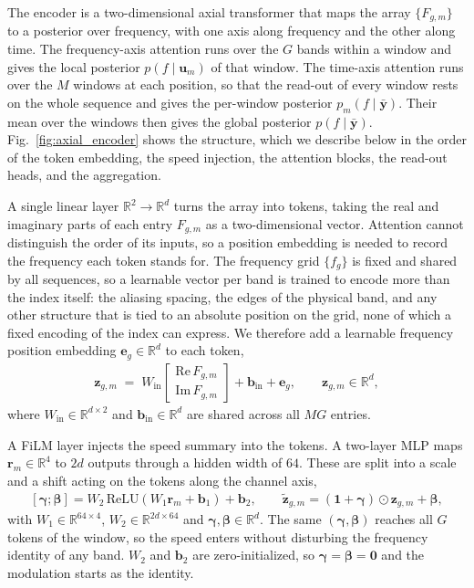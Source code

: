\documentclass[journal,onecolumn]{IEEEtran}
\begin{document}
The encoder is a two-dimensional axial transformer that maps the array $\{F_{g,m}\}$ to a posterior over frequency, with one axis along frequency and the other along time. The frequency-axis attention runs over the $G$ bands within a window and gives the local posterior $p(f\mid\mathbf{u}_m)$ of that window. The time-axis attention runs over the $M$ windows at each position, so that the read-out of every window rests on the whole sequence and gives the per-window posterior $p_m(f\mid\bar{\mathbf{y}})$. Their mean over the windows then gives the global posterior $p(f\mid\bar{\mathbf{y}})$. Fig.~\ref{fig:axial_encoder} shows the structure, which we describe below in the order of the token embedding, the speed injection, the attention blocks, the read-out heads, and the aggregation.

A single linear layer $\mathbb{R}^{2}\to\mathbb{R}^{d}$ turns the array into tokens, taking the real and imaginary parts of each entry $F_{g,m}$ as a two-dimensional vector. Attention cannot distinguish the order of its inputs, so a position embedding is needed to record the frequency each token stands for. The frequency grid $\{f_g\}$ is fixed and shared by all sequences, so a learnable vector per band is trained to encode more than the index itself: the aliasing spacing, the edges of the physical band, and any other structure that is tied to an absolute position on the grid, none of which a fixed encoding of the index can express. We therefore add a learnable frequency position embedding $\mathbf{e}_g\in\mathbb{R}^{d}$ to each token,
\begin{eqnarray}
\label{eq:embed}
\mathbf{z}_{g,m} \;=\; W_{\mathrm{in}}
\begin{bmatrix}\mathrm{Re}\,F_{g,m}\\[2pt] \mathrm{Im}\,F_{g,m}\end{bmatrix}
+\mathbf{b}_{\mathrm{in}}+\mathbf{e}_g ,
\qquad \mathbf{z}_{g,m}\in\mathbb{R}^{d},
\end{eqnarray}
where $W_{\mathrm{in}}\in\mathbb{R}^{d\times 2}$ and $\mathbf{b}_{\mathrm{in}}\in\mathbb{R}^{d}$ are shared across all $MG$ entries.

A FiLM layer injects the speed summary into the tokens. A two-layer MLP maps $\mathbf{r}_m\in\mathbb{R}^{4}$ to $2d$ outputs through a hidden width of $64$. These are split into a scale and a shift acting on the tokens along the channel axis,
\begin{eqnarray}
\label{eq:film}
[\boldsymbol\gamma;\boldsymbol\beta]=W_2\,\mathrm{ReLU}(W_1\mathbf{r}_m+\mathbf{b}_1)+\mathbf{b}_2,
\qquad
\tilde{\mathbf{z}}_{g,m}=(\mathbf{1}+\boldsymbol\gamma)\odot\mathbf{z}_{g,m}+\boldsymbol\beta ,
\end{eqnarray}
with $W_1\in\mathbb{R}^{64\times 4}$, $W_2\in\mathbb{R}^{2d\times 64}$ and $\boldsymbol\gamma,\boldsymbol\beta\in\mathbb{R}^{d}$. The same $(\boldsymbol\gamma,\boldsymbol\beta)$ reaches all $G$ tokens of the window, so the speed enters without disturbing the frequency identity of any band. $W_2$ and $\mathbf{b}_2$ are zero-initialized, so $\boldsymbol\gamma=\boldsymbol\beta=\mathbf{0}$ and the modulation starts as the identity.
\end{document}
